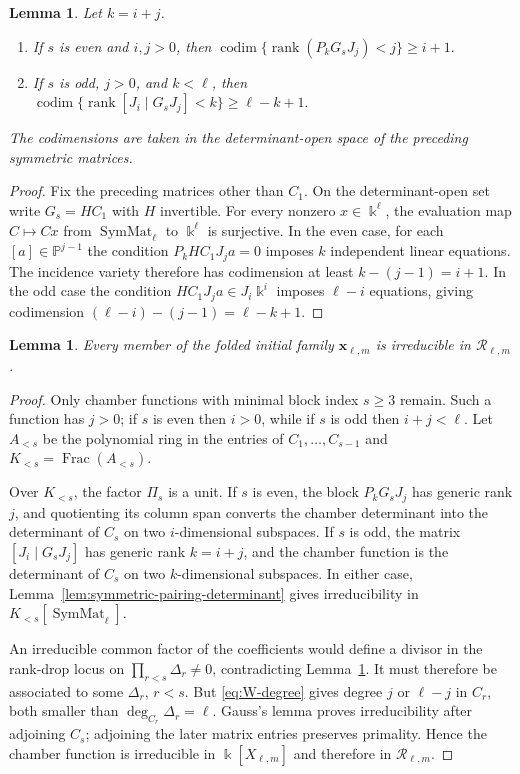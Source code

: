 \documentclass[11pt]{amsart}
\newtheorem{lemma}[theorem]{Lemma}
\theoremstyle{definition}
\theoremstyle{remark}
\newcommand{\kk}{\Bbbk}
\newcommand{\SymMat}{\operatorname{SymMat}}
\newcommand{\cR}{\mathcal R}
\newcommand{\Frac}{\operatorname{Frac}}
\begin{document}
\begin{lemma}\label{lem:rank-drop-codimension}
Let $k=i+j$.
\begin{enumerate}
 \item If $s$ is even and $i,j>0$, then
 $\operatorname{codim} \{\operatorname{rank}(P_kG_sJ_j)<j\}\ge i+1.$
 \item If $s$ is odd, $j>0$, and $k<\ell$, then
 $\operatorname{codim} \{\operatorname{rank}[J_i\mid G_sJ_j]<k\} \ge\ell-k+1.$
\end{enumerate}
The codimensions are taken in the determinant-open space of the preceding
symmetric matrices.
\end{lemma}

\begin{proof}
Fix the preceding matrices other than $C_1$.  On the determinant-open set
write $G_s=HC_1$ with $H$ invertible.  For every nonzero $x\in\kk^\ell$,
the evaluation map $C\mapsto Cx$ from $\SymMat_\ell$ to $\kk^\ell$ is
surjective.  In the even case, for each $[a]\in\mathbb P^{j-1}$ the
condition
$P_kHC_1J_ja=0$
imposes $k$ independent linear equations.  The incidence variety therefore
has codimension at least $k-(j-1)=i+1$.  In the odd case the condition
$HC_1J_ja\in J_i\kk^i$ imposes $\ell-i$ equations, giving codimension
$(\ell-i)-(j-1)=\ell-k+1$.
\end{proof}

\begin{lemma}
\label{lem:initial-functions-irreducible}
Every member of the folded initial family $\mathbf x_{\ell,m}$ is
irreducible in $\cR_{\ell,m}$.
\end{lemma}

\begin{proof}
Only chamber functions with minimal block index $s\ge3$ remain.  Such a function has
$j>0$; if $s$ is even then $i>0$, while if $s$ is odd then $i+j<\ell$.
Let $A_{<s}$ be the polynomial ring in the entries of
$C_1,\ldots,C_{s-1}$ and $K_{<s}=\Frac(A_{<s})$.

Over $K_{<s}$, the factor $\Pi_s$ is a unit.  If $s$ is even, the block
$P_kG_sJ_j$ has generic rank $j$, and quotienting its column span converts
the chamber determinant into the determinant of $C_s$ on two
$i$-dimensional subspaces.  If $s$ is odd, the matrix
$[J_i\mid G_sJ_j]$ has generic rank $k=i+j$, and the chamber function is the
determinant of $C_s$ on two $k$-dimensional subspaces.  In either case,
Lemma~\ref{lem:symmetric-pairing-determinant} gives irreducibility in
$K_{<s}[\SymMat_\ell]$.

An irreducible common factor of the coefficients would define a divisor in the
rank-drop locus on $\prod_{r<s}\Delta_r\ne0$, contradicting
Lemma~\ref{lem:rank-drop-codimension}.  It must therefore be associated to
some $\Delta_r$, $r<s$.  But \eqref{eq:W-degree} gives degree $j$ or
$\ell-j$ in $C_r$, both smaller than $\deg_{C_r}\Delta_r=\ell$.  Gauss's
lemma proves irreducibility after adjoining $C_s$; adjoining the later
matrix entries preserves primality.  Hence the chamber function is
irreducible in $\kk[X_{\ell,m}]$ and therefore in $\cR_{\ell,m}$.
\end{proof}
\end{document}
